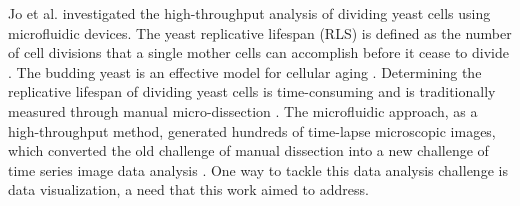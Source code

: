 \documentclass[conference]{IEEEtran}
\begin{document}

Jo et al. \cite{r13} investigated the high-throughput analysis of dividing yeast cells using microfluidic devices. 
The yeast replicative lifespan (RLS) is defined as the number of cell divisions that a single mother cells can accomplish before it cease to divide \cite{r14}. The budding yeast is an effective model for cellular aging \cite{r15}. Determining the replicative lifespan of dividing yeast cells is time-consuming and is traditionally  measured through manual micro-dissection \cite{r16,r17}. The microfluidic approach, as a high-throughput method, generated hundreds of time-lapse microscopic images, which converted the old challenge of manual dissection into a new challenge of time series image data analysis \cite{r18,r19,r20}. One way to tackle this data analysis challenge is data visualization, a need that this work aimed to address. 

\end{document}
